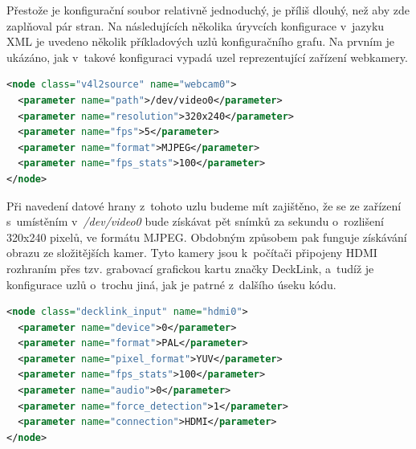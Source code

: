 \documentclass[thesis=M,czech]{FITthesis}[2012/06/26]
\begin{document}
Přestože je konfigurační soubor relativně jednoduchý, je příliš dlouhý, než aby zde zaplňoval pár stran. Na následujících několika úryvcích konfigurace v~jazyku XML je uvedeno několik příkladových uzlů konfiguračního grafu. Na prvním je ukázáno, jak v~takové konfiguraci vypadá uzel reprezentující zařízení webkamery.\\

\begin{lstlisting}[language=XML]
<node class="v4l2source" name="webcam0">
  <parameter name="path">/dev/video0</parameter>
  <parameter name="resolution">320x240</parameter>
  <parameter name="fps">5</parameter>
  <parameter name="format">MJPEG</parameter>
  <parameter name="fps_stats">100</parameter>
</node>
\end{lstlisting}

Při navedení datové hrany z~tohoto uzlu budeme mít zajištěno, že se ze zařízení s~umístěním v~\textit{/dev/video0} bude získávat pět snímků za sekundu o~rozlišení 320x240 pixelů, ve formátu MJPEG. Obdobným způsobem pak funguje získávání obrazu ze složitějších kamer. Tyto kamery jsou k~počítači připojeny HDMI rozhraním přes tzv. grabovací grafickou kartu značky DeckLink, a~tudíž je konfigurace uzlů o~trochu jiná, jak je patrné z~dalšího úseku kódu.\\

\begin{lstlisting}[language=XML]
<node class="decklink_input" name="hdmi0">
  <parameter name="device">0</parameter>
  <parameter name="format">PAL</parameter>
  <parameter name="pixel_format">YUV</parameter>
  <parameter name="fps_stats">100</parameter>
  <parameter name="audio">0</parameter>
  <parameter name="force_detection">1</parameter>
  <parameter name="connection">HDMI</parameter>
</node>
\end{lstlisting}
\end{document}
